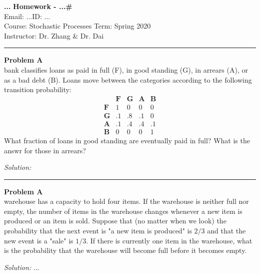 \documentclass[a4paper, 11pt]{article}
\newenvironment{problem}[2][Problem]
    { \begin{mdframed}[backgroundcolor=gray!20] \textbf{#1 #2} \\}
    {  \end{mdframed}}
\newenvironment{solution}
    {\textit{Solution:}}
    {}
\begin{document}
\noindent
\large\textbf{...} \hfill \textbf{Homework - ...\#}   \\
Email: ...\hfill ID: ... \\
\normalsize Course: Stochastic Processes  \hfill Term: Spring 2020\\
Instructor: Dr. Zhang \& Dr. Dai \\%
\noindent\rule{7in}{2.8pt}
\begin{problem}{1.56}
A bank classifies loans as paid in full (F), in good standing (G), in arrears
(A), or as a bad debt (B). Loans move between the categories according to the following transition probability:
$$\begin{array}{lllll} 
& \mathbf{F} & \mathbf{G} & \mathbf{A} & \mathbf{B} \\
\mathbf{F} & 1 & 0 & 0 & 0 \\
\mathbf{G} & .1 & .8 & .1 & 0 \\
\mathbf{A} & .1 & .4 & .4 & .1 \\
\mathbf{B} & 0 & 0 & 0 & 1
\end{array}$$
What fraction of loans in good standing are eventually paid in full? What is the answr for those in arrears?

\end{problem}
\begin{solution}

\end{solution} 
\noindent\rule{7in}{2.8pt}


\begin{problem}{1.57}
A warehouse has a capacity to hold four items. If the warehouse is neither full nor empty, the number of items in the warehouse changes whenever a new item is produced or an item is sold. Suppose that (no matter when we look) the probability that the next event is "a new item is produced" is $2 / 3$ and that the new event is a "sale" is $1/3$. If there is currently one item in the warehouse, what is the probability that the warehouse will become full before it becomes empty.

\end{problem}
\begin{solution}
...
\end{solution} 
\end{document}
